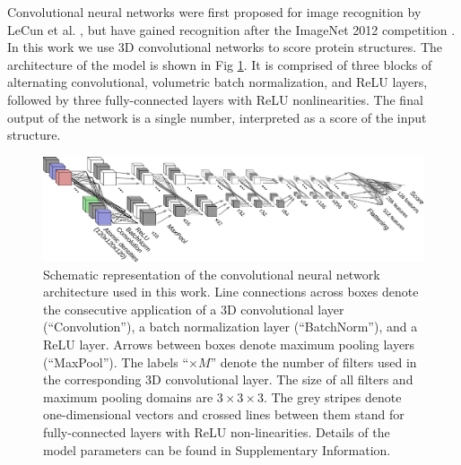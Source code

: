 Convolutional neural networks were first proposed for image
recognition by LeCun et al. \cite{lecun1989backpropagation}, but have
gained recognition after the ImageNet 2012
competition \cite{krizhevsky2012imagenet}.  In this work we use 3D
convolutional networks to score protein structures. The architecture
of the model is shown in Fig \ref{Fig:CNNModel}.  It is comprised of
three blocks of alternating convolutional, volumetric batch
normalization, and ReLU layers, followed by three fully-connected
layers with ReLU nonlinearities. The final output of the network is a
single number, interpreted as a score of the input structure.

\begin{figure}[H]
    \centering
    \includegraphics[width=\linewidth]{Fig/ConvnetDiagramV1.png}

    \caption{Schematic representation of the convolutional neural
    network architecture used in this work.  Line connections across
    boxes denote the consecutive application of a 3D convolutional
    layer (``Convolution''), a batch normalization layer
    (``BatchNorm''), and a ReLU layer. Arrows between boxes denote
    maximum pooling layers (``MaxPool''). The labels ``$\times M$''
    denote the number of filters used in the corresponding 3D
    convolutional layer. The size of all filters and maximum pooling
    domains are $3\times 3\times 3$. The grey stripes denote
    one-dimensional vectors and crossed lines between them stand for
    fully-connected layers with ReLU non-linearities. Details of the
    model parameters can be found in Supplementary Information.}

    \label{Fig:CNNModel}
\end{figure}

